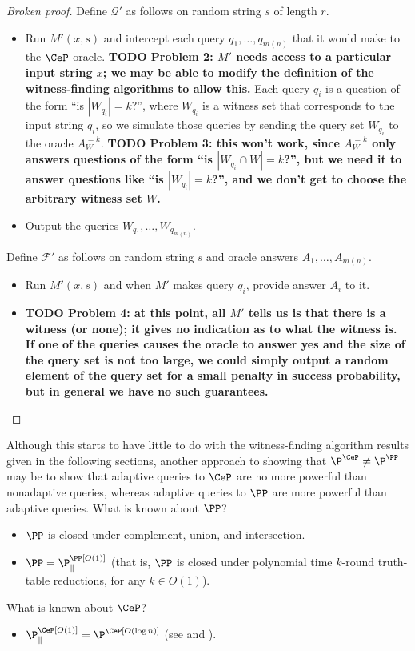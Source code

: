 \documentclass{article}
\newcommand{\todo}[1]{\textbf{TODO #1}}
\newcommand{\mc}{\mathcal}
\begin{document}
\begin{proof}[Broken proof]
  Define $\mc{Q}'$ as follows on random string $s$ of length $r$.
  \begin{itemize}
  \item Run $M'(x, s)$ and intercept each query $q_1, \dotsc, q_{m(n)}$ that it would make to the $\CeP$ oracle.
    \todo{Problem 2: $M'$ needs access to a particular input string $x$; we may be able to modify the definition of the witness-finding algorithms to allow this.}
    Each query $q_i$ is a question of the form ``is $|W_{q_i}| = k$?'', where $W_{q_i}$ is a witness set that corresponds to the input string $q_i$, so we simulate those queries by sending the query set $W_{q_i}$ to the oracle $A^{= k}_W$.
    \todo{Problem 3: this won't work, since $A^{= k}_W$ only answers questions of the form ``is $|W_{q_i} \cap W| = k$?'', but we need it to answer questions like ``is $|W_{q_i}| = k$?'', and we don't get to choose the arbitrary witness set $W$.}
  \item Output the queries $W_{q_1}, \dotsc, W_{q_{m(n)}}$.
  \end{itemize}
  Define $\mc{F}'$ as follows on random string $s$ and oracle answers $A_1, \dotsc, A_{m(n)}$.
  \begin{itemize}
  \item Run $M'(x, s)$ and when $M'$ makes query $q_i$, provide answer $A_i$ to it.
  \item \todo{Problem 4: at this point, all $M'$ tells us is that there is a witness (or none); it gives no indication as to what the witness is.
    If one of the queries causes the oracle to answer yes and the size of the query set is not too large, we could simply output a random element of the query set for a small penalty in success probability, but in general we have no such guarantees.}
  \end{itemize}
\end{proof}

Although this starts to have little to do with the witness-finding algorithm results given in the following sections, another approach to showing that $\P^{\CeP} \neq \P^\PP$ may be to show that adaptive queries to $\CeP$ are no more powerful than nonadaptive queries, whereas adaptive queries to $\PP$ are more powerful than adaptive queries.
What is known about $\PP$?
\begin{itemize}
\item $\PP$ is closed under complement, union, and intersection.
\item $\PP = \P^{\PP[O(1)]}_\parallel$ (that is, $\PP$ is closed under polynomial time $k$-round truth-table reductions, for any $k \in O(1)$).
\end{itemize}
What is known about $\CeP$?
\begin{itemize}
\item $\P^{\CeP[O(1)]}_\parallel = \P^{\CeP[O(\log n)]}$ (see \autocite[Theorem~5]{green93} and \autocite[Corollary~4.6]{ogiwara94}).
\end{itemize}
\end{document}
